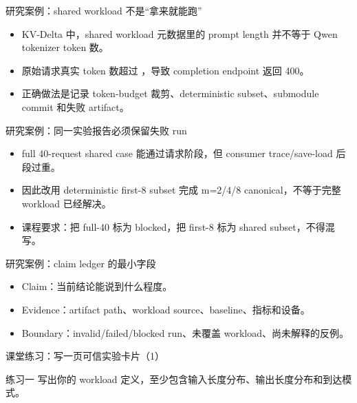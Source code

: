 \begin{frame}{研究案例：shared workload 不是“拿来就能跑”}
  \begin{itemize}
    \item KV-Delta 中，shared workload 元数据里的 prompt length 并不等于 Qwen tokenizer token 数。
    \item 原始请求真实 token 数超过 \texttt{}，导致 completion endpoint 返回 400。
    \item 正确做法是记录 token-budget 裁剪、deterministic subset、submodule commit 和失败 artifact。
  \end{itemize}
\end{frame}

\begin{frame}{研究案例：同一实验报告必须保留失败 run}
  \begin{itemize}
    \item full 40-request shared case 能通过请求阶段，但 consumer trace/save-load 后段过重。
    \item 因此改用 deterministic first-8 subset 完成 m=2/4/8 canonical，不等于完整 workload 已经解决。
    \item 课程要求：把 full-40 标为 blocked，把 first-8 标为 shared subset，不得混写。
  \end{itemize}
\end{frame}

\begin{frame}{研究案例：claim ledger 的最小字段}
  \begin{itemize}
    \item Claim：当前结论能说到什么程度。
    \item Evidence：artifact path、workload source、baseline、指标和设备。
    \item Boundary：invalid/failed/blocked run、未覆盖 workload、尚未解释的反例。
  \end{itemize}
\end{frame}

\begin{frame}{课堂练习：写一页可信实验卡片（1）}
\begin{block}{练习一}
    写出你的 workload 定义，至少包含输入长度分布、输出长度分布和到达模式。
  \end{block}
\end{frame}

